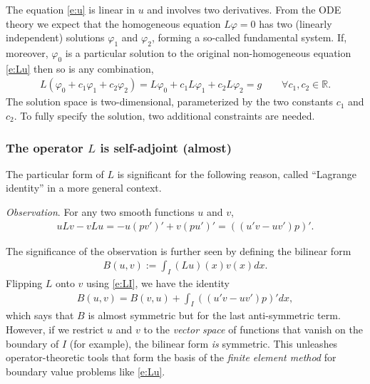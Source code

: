\documentclass[12pt,a4paper]{article}
\newcommand{\IR}{\mathbb{R}}
\begin{document}
    The equation \eqref{e:u} is linear in $u$ and involves two derivatives.
    From the ODE theory we expect that
    the homogeneous equation
    $L \varphi = 0$
    has two (linearly independent) solutions
    $\varphi_1$ and $\varphi_2$,
    forming a so-called fundamental system.
    If, moreover, $\varphi_0$ is a particular solution
    to the original non-homogeneous equation \eqref{e:Lu}
    then so is any combination,
    \begin{align}
        L(\varphi_0 + c_1 \varphi_1 + c_2 \varphi_2)
        =
        L \varphi_0
        +
        c_1 L \varphi_1
        +
        c_2 L \varphi_2
        = 
        g
        \qquad
        \forall c_1, c_2 \in \IR
        .
    \end{align}
    The solution space is two-dimensional,
    parameterized by the two constants $c_1$ and $c_2$.
    To fully specify the solution,
    two additional constraints are needed.
    
    
    
    \subsubsection*{The operator $L$ is self-adjoint (almost)}
    
    The particular form of $L$ is significant 
    for the following reason,
    called ``Lagrange identity'' in a more general context.
    
    \emph{Observation}.
    For any two smooth functions $u$ and $v$,
    \begin{align}
        \label{e:LI}
        u L v - v L u
        =
        - u (p v')'
        + v (p u')'
        =
        ((u' v - u v') p)'
        .
    \end{align}
    
    
    The significance of the observation 
    is further seen by defining
    the bilinear form
    \begin{align}
        B(u, v) 
        :=
        \int_I (L u)(x) v(x) dx
        .
    \end{align}
    Flipping $L$ onto $v$ using \eqref{e:LI}, 
    we have the identity
    \begin{align}
        B(u, v)
        =
        B(v, u)
        +
        \int_I ((u' v - u v') p)' dx
        ,
    \end{align}
    which says that $B$ is almost symmetric
    but for the last anti-symmetric term.
    However,
    if we restrict $u$ and $v$ 
    to the \emph{vector space} of functions
    that vanish on the boundary of $I$
    (for example),
    the bilinear form \emph{is} symmetric.
    This unleashes operator-theoretic tools
    that form the basis of 
    the \emph{finite element method}
    for boundary value problems like \eqref{e:Lu}.
    
\end{document}
